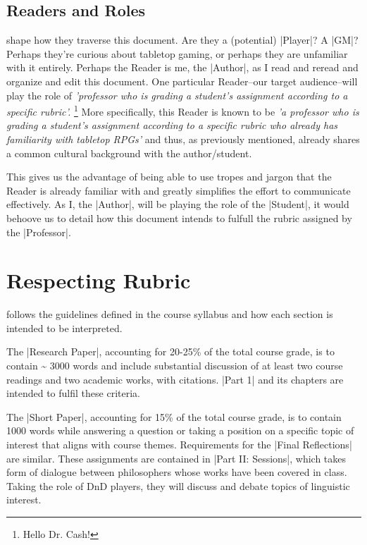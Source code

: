 \documentclass[10pt,twoside,twocolumn,openany,nomultitoc]{book}
\begin{document}
     
 \subsection{Readers and Roles}   
     shape how they traverse this document.  Are they a (potential) |Player|? A |GM|?
    Perhaps they're curious about tabletop gaming, or perhaps they are unfamiliar with it entirely. Perhaps the Reader is me, the |Author|, as I read and reread and organize and edit this document.
        One particular Reader--our target audience--will play the role of \textit{'professor who is grading a student's assignment according to a specific rubric'.} 
        \footnote{Hello Dr. Cash!} 
        More specifically, this Reader is known to be \textit{'a professor who is grading a student's assignment according to a specific rubric who already has familiarity with tabletop RPGs'} and thus, as previously mentioned, already shares a common cultural background with the author/student.

    This gives us the advantage of being able to use tropes and jargon that the Reader is already familiar with and greatly simplifies the effort to communicate effectively. As I, the |Author|, will be playing the role of the |Student|, it would behoove us to detail how this document intends to fulfull the rubric assigned by the |Professor|. 
 
 \section{Respecting Rubric}
     follows the guidelines defined in the course syllabus and how each section is intended to be interpreted. 
    
    The |Research Paper|, accounting for 20-25\% of the total course grade, is to contain \~{} 3000 words and include substantial discussion of at least two course readings and two academic works, with citations. |Part 1| and its chapters are intended to fulfil these criteria. %
    
    The |Short Paper|, accounting for 15\% of the total course grade, is to contain 1000 words while answering a question or taking a position on a specific topic of interest that aligns with course themes. Requirements for the |Final Reflections| are similar. These assignments are contained in |Part II: Sessions|, which takes form of dialogue between philosophers whose works have been covered in class. Taking the role of DnD players, they will discuss and debate topics of linguistic interest. 
    
\end{document}
